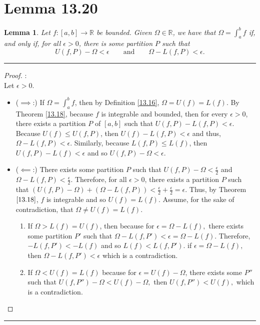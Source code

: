 \documentclass[openany, amssymb, psamsfonts]{amsart}
\newcommand{\bbR}{\mathbb{R}}
\newtheorem{lem}{Lemma}[section]
\theoremstyle{definition}
\numberwithin{equation}{section}
\begin{document}
\section*{Lemma 13.20}
\begin{lem}
\label{13.20}
	Let $f\colon [a, b] \to \bbR$ be bounded. Given $\Omega \in \bbR$, we have that $\Omega= \int_a^b f$ if, and only if, for all $\epsilon > 0$, there is some partition $P$ such that 
	\[
		U(f, P) - \Omega < \epsilon \qquad \text{and} \qquad \Omega - L(f, P) < \epsilon.
	\]
\end{lem}
\vspace{4pt}     \hrule   \vspace{4pt} \begin{proof}:\\
Let $\epsilon>0.$
\begin{itemize}
    \item ($\implies$:) If $\Omega = \int_a^bf$, then by Definition \ref{13.16}, $\Omega = U(f) = L(f)$. By Theorem \ref{13.18}, because $f$ is integrable and bounded, then for every $\epsilon>0$, there exists a partition $P$ of $[a,b]$ such that $U(f,P)-L(f,P)< \epsilon$. Because $U(f) \leq U(f,P)$, then $U(f) - L(f,P)<\epsilon$ and thus, $\Omega - L(f,P)<\epsilon$. Similarly, because $L(f,P)\leq L(f)$, then $U(f,P) - L(f)<\epsilon$ and so $U(f,P) - \Omega<\epsilon$.
    \item ($\impliedby$:) There exists some partition $P$ such that $U(f,P) - \Omega < \frac{\epsilon}{2}$ and $\Omega - L(f,P)< \frac{\epsilon}{2}$. Therefore, for all $\epsilon>0$, there exists a partition $P$ such that $(U(f,P) - \Omega) + (\Omega - L(f,P)) < \frac{\epsilon}{2} + \frac{\epsilon}{2} = \epsilon$. Thus, by Theorem $\ref{13.18}$, $f$ is integrable and so $U(f) = L(f)$. Assume, for the sake of contradiction, that $\Omega \neq U(f) = L(f)$. 
    \begin{enumerate}
        \item If $\Omega>L(f) = U(f)$, then because for $\epsilon = \Omega - L(f),$ there exists some  partition $P'$ such that $\Omega - L(f,P')<\epsilon = \Omega - L(f)$. Therefore, $-L(f,P')< -L(f)$ and so $L(f)< L(f,P')$. if $\epsilon = \Omega - L(f),$ then $\Omega - L(f,P')< \epsilon$ which is a contradiction.
        \item If $\Omega<U(f)=L(f)$ because for $\epsilon = U(f) - \Omega$, there exists some $P''$ such that $U(f,P'') - \Omega < U(f) - \Omega,$ then $U(f,P'')< U(f),$ which is a contradiction. 
    \end{enumerate}
\end{itemize}
\end{proof}\vspace{4pt}     \hrule   \vspace{4pt}
\end{document}
